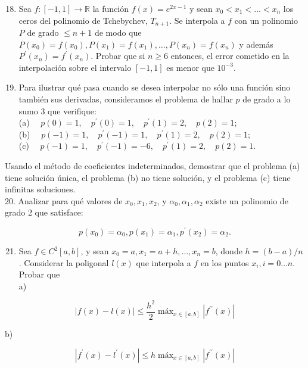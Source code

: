 \documentclass[10pt]{article}
\begin{document}
\begin{enumerate}
  \setcounter{enumi}{17}
  \item Sea $f:[-1,1] \rightarrow \mathbb{R}$ la función $f(x)=e^{2 x-1}$ y sean $x_{0}<x_{1}<\ldots<x_{n}$ los ceros del polinomio de Tchebychev, $T_{n+1}$. Se interpola a $f$ con un polinomio $P$ de grado $\leq n+1$ de modo que $P\left(x_{0}\right)=f\left(x_{0}\right), P\left(x_{1}\right)=f\left(x_{1}\right), \ldots, P\left(x_{n}\right)=f\left(x_{n}\right)$ y además $P^{\prime}\left(x_{n}\right)=f^{\prime}\left(x_{n}\right)$. Probar que si $n \geq 6$ entonces, el error cometido en la interpolación sobre el intervalo $[-1,1]$ es menor que $10^{-3}$.
  \item Para ilustrar qué pasa cuando se desea interpolar no sólo una función sino también sus derivadas, consideramos el problema de hallar $p$ de grado a lo sumo 3 que verifique:\\
(a) $\quad p(0)=1, \quad p^{\prime}(0)=1, \quad p^{\prime}(1)=2, \quad p(2)=1 ;$\\
(b) $\quad p(-1)=1, \quad p^{\prime}(-1)=1, \quad p^{\prime}(1)=2, \quad p(2)=1$;\\
(c) $\quad p(-1)=1, \quad p^{\prime}(-1)=-6, \quad p^{\prime}(1)=2, \quad p(2)=1$.
\end{enumerate}

Usando el método de coeficientes indeterminados, demostrar que el problema (a) tiene solución única, el problema (b) no tiene solución, y el problema (c) tiene infinitas soluciones.\\
20. Analizar para qué valores de $x_{0}, x_{1}, x_{2}$, y $\alpha_{0}, \alpha_{1}, \alpha_{2}$ existe un polinomio de grado 2 que satisface:

$$
p\left(x_{0}\right)=\alpha_{0}, p\left(x_{1}\right)=\alpha_{1}, p^{\prime}\left(x_{2}\right)=\alpha_{2} .
$$

\begin{enumerate}
  \setcounter{enumi}{20}
  \item Sea $f \in C^{2}[a, b]$, y sean $x_{0}=a, x_{1}=a+h, \ldots, x_{n}=b$, donde $h=(b-a) / n$. Considerar la poligonal $l(x)$ que interpola a $f$ en los puntos $x_{i}, i=0 \ldots n$. Probar que\\
a)
\end{enumerate}

$$
|f(x)-l(x)| \leq \frac{h^{2}}{2} \operatorname{máx}_{x \in[a, b]}\left|f^{\prime \prime}(x)\right|
$$

b)

$$
\left|f^{\prime}(x)-l^{\prime}(x)\right| \leq h \operatorname{máx}_{x \in[a, b]}\left|f^{\prime \prime}(x)\right|
$$
\end{document}
